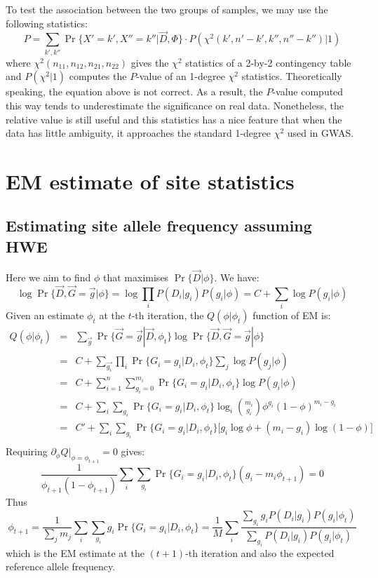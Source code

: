 \documentclass[pdftex,10pt]{book}
\begin{document}
To test the association between the two groups of samples, we may use
the following statistics:
\[
P=\sum_{k',k''}\Pr\{X'=k',X''=k''|\vec{D},\Phi\}\cdot P(\chi^2(k',n'-k',k'',n''-k'')|1)
\]
where $\chi^2(n_{11},n_{12},n_{21},n_{22})$ gives the $\chi^2$ statistics of
a 2-by-2 contingency table and $P(\chi^2|1)$ computes the $P$-value of an 1-degree
$\chi^2$ statistics. Theoretically speaking, the equation above is not correct.
As a result, the $P$-value computed this way tends to underestimate the significance
on real data. Nonetheless, the relative value is still useful and this statistics
has a nice feature that when the data has little ambiguity, it approaches
the standard 1-degree $\chi^2$ used in GWAS.



\section{EM estimate of site statistics}

\subsection{Estimating site allele frequency assuming HWE}
Here we aim to find $\phi$ that maximises $\Pr\{\vec{D}|\phi\}$. We have:
$$\log \Pr\{\vec{D},\vec{G}=\vec{g}|\phi\}=\log\prod_iP(D_i|g_i)P(g_i|\phi)=C+\sum_i\log P(g_i|\phi)$$
Given an estimate $\phi_t$ at the $t$-th iteration, the $Q(\phi|\phi_t)$
function of EM is:
\begin{eqnarray*}
  Q(\phi|\phi_t)&=&\sum_{\vec{g}}\Pr\{\vec{G}=\vec{g}|\vec{D},\phi_t\}\log \Pr\{\vec{D},\vec{G}=\vec{g}|\phi\}\\
  &=&C+\sum_{\vec{g_i}}\prod_i\Pr\{G_i=g_i|D_i,\phi_t\}\sum_j\log P(g_j|\phi)\\
  &=&C+\sum_{i=1}^n\sum_{g_i=0}^{m_i}\Pr\{G_i=g_i|D_i,\phi_t\}\log P(g_i|\phi)\\
  &=&C+\sum_i\sum_{g_i}\Pr\{G_i=g_i|D_i,\phi_t\}\log_i \binom{m_i}{g_i}\phi^{g_i}(1-\phi)^{m_i-g_i}\\
  &=&C'+\sum_i\sum_{g_i}\Pr\{G_i=g_i|D_i,\phi_t\}\Big[g_i\log\phi+(m_i-g_i)\log(1-\phi)\Big]\\
\end{eqnarray*}
Requiring $\partial_{\phi}Q\Big|_{\phi=\phi_{t+1}}=0$ gives:
$$\frac{1}{\phi_{t+1}(1-\phi_{t+1})}\sum_i\sum_{g_i}\Pr\{G_i=g_i|D_i,\phi_t\}(g_i-m_i\phi_{t+1})=0$$
Thus
\begin{equation}\label{equ:freq1}
\phi_{t+1}=\frac{1}{\sum_jm_j}\sum_i\sum_{g_i}g_i\Pr\{G_i=g_i|D_i,\phi_t\}
=\frac{1}{M}\sum_i\frac{\sum_{g_i}g_iP(D_i|g_i)P(g_i|\phi_t)}{\sum_{g_i}P(D_i|g_i)P(g_i|\phi_t)}
\end{equation}
which is the EM estimate at the $(t+1)$-th iteration and also the
expected reference allele frequency.
\end{document}
